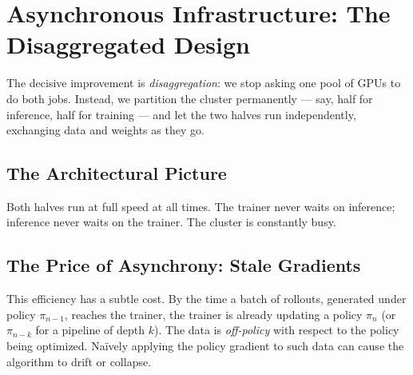 \documentclass[11pt,a4paper]{article}
\theoremstyle{definition}
\theoremstyle{plain}
\begin{document}
\section{Asynchronous Infrastructure: The Disaggregated Design}

The decisive improvement is \emph{disaggregation}: we stop asking one pool of GPUs to do both jobs. Instead, we partition the cluster permanently --- say, half for inference, half for training --- and let the two halves run independently, exchanging data and weights as they go.

\subsection{The Architectural Picture}

\begin{center}
\end{center}

Both halves run at full speed at all times. The trainer never waits on inference; inference never waits on the trainer. The cluster is constantly busy.

\subsection{The Price of Asynchrony: Stale Gradients}

This efficiency has a subtle cost. By the time a batch of rollouts, generated under policy $\pi_{n-1}$, reaches the trainer, the trainer is already updating a policy $\pi_n$ (or $\pi_{n-k}$ for a pipeline of depth $k$). The data is \emph{off-policy} with respect to the policy being optimized. Na\"ively applying the policy gradient to such data can cause the algorithm to drift or collapse.
\end{document}

